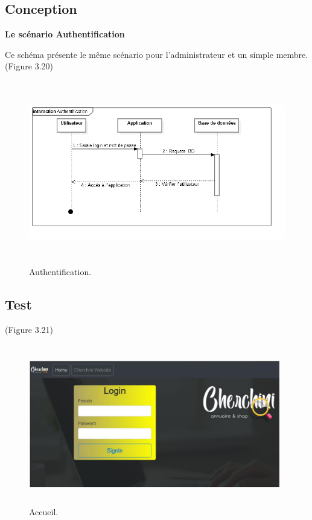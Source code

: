 
\subsection{Conception}
\textbf{Le sc\'{e}nario \guillemotleft{} Authentification \guillemotright{}}

Ce sch\'{e}ma pr\'{e}sente le m\^{e}me sc\'{e}nario pour l'administrateur et un simple
membre.(Figure 3.20) 

\begin{figure}[H]
\center
\includegraphics[width=14cm,height=8cm]{./figures/seq/A.png}
\caption{Authentification.}
\end{figure}


\subsection{Test}

 (Figure 3.21)
\begin{figure}[H]
\center
\includegraphics[width=11cm,height=7cm]{./figures/pres/1.png}
\caption{Accueil.}

\end{figure}
